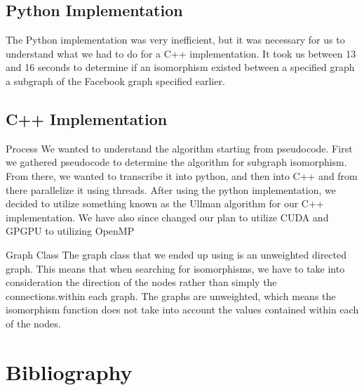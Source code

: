 \documentclass{article}
\begin{document}
  \subsection{Python Implementation}
  The Python implementation was very inefficient, but it was necessary for us to understand what we had to do for a C++ implementation. It took us between 13 and 16 seconds to determine if an isomorphism existed between a specified graph a subgraph of the Facebook graph specified earlier.

  \subsection{C++ Implementation}
Process
We wanted to understand the algorithm starting from pseudocode. First we gathered pseudocode to determine the algorithm for subgraph isomorphism. From there, we wanted to transcribe it into python, and then into C++ and from there parallelize it using threads. After using the python implementation, we decided to utilize something known as the Ullman algorithm for our C++ implementation. We have also since changed our plan to utilize CUDA and GPGPU to utilizing OpenMP

Graph Class
The graph class that we ended up using is an unweighted directed graph. This means that when searching for isomorphisms, we have to take into consideration the direction of the nodes rather than simply the connections.within each graph. The graphs are unweighted, which means the isomorphism function does not take into account the values contained within each of the nodes. 

  \section{Bibliography}
\end{document}
